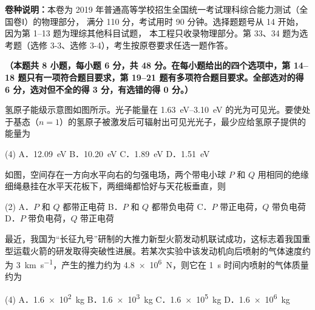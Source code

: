
\begin{gknotice}
  \textbf{卷种说明：}本卷为 2019 年普通高等学校招生全国统一考试理科综合能力测试（全国卷Ⅰ）的物理部分，
  满分 110 分，考试用时 90 分钟。选择题题号从 14 开始，因为第 1--13 题为理综其他科目试题，
  本工程只收录物理部分。第 33、34 题为选考题（选修 3-3、选修 3-4），考生按原卷要求任选一题作答。
\end{gknotice}


\textbf{（本题共 8 小题，每小题 6 分，共 48 分。在每小题给出的四个选项中，第 14--18 题只有一项符合题目要求，第 19--21 题有多项符合题目要求。全部选对的得 6 分，选对但不全的得 3 分，有选错的得 0 分。）}

\begin{question}
氢原子能级示意图如图所示。光子能量在 \SI{1.63}{eV}--\SI{3.10}{eV} 的光为可见光。要使处于基态（$n=1$）的氢原子被激发后可辐射出可见光光子，最少应给氢原子提供的能量为\gkblank


\begin{gkopts}(4)
  \task A．\SI{12.09}{eV}
  \task B．\SI{10.20}{eV}
  \task C．\SI{1.89}{eV}
  \task D．\SI{1.51}{eV}
\end{gkopts}
\end{question}

\begin{question}
如图，空间存在一方向水平向右的匀强电场，两个带电小球 $P$ 和 $Q$ 用相同的绝缘细绳悬挂在水平天花板下，两细绳都恰好与天花板垂直，则\gkblank


\begin{gkopts}(2)
  \task A．$P$ 和 $Q$ 都带正电荷
  \task B．$P$ 和 $Q$ 都带负电荷
  \task C．$P$ 带正电荷，$Q$ 带负电荷
  \task D．$P$ 带负电荷，$Q$ 带正电荷
\end{gkopts}
\end{question}

\begin{question}
最近，我国为“长征九号”研制的大推力新型火箭发动机联试成功，这标志着我国重型运载火箭的研发取得突破性进展。若某次实验中该发动机向后喷射的气体速度约为 \SI{3}{\kilo\metre\per\second}，产生的推力约为 \SI{4.8e6}{\newton}，则它在 \SI{1}{\second} 时间内喷射的气体质量约为\gkblank

\begin{gkopts}(4)
  \task A．\SI{1.6e2}{\kilogram}
  \task B．\SI{1.6e3}{\kilogram}
  \task C．\SI{1.6e5}{\kilogram}
  \task D．\SI{1.6e6}{\kilogram}
\end{gkopts}
\end{question}

